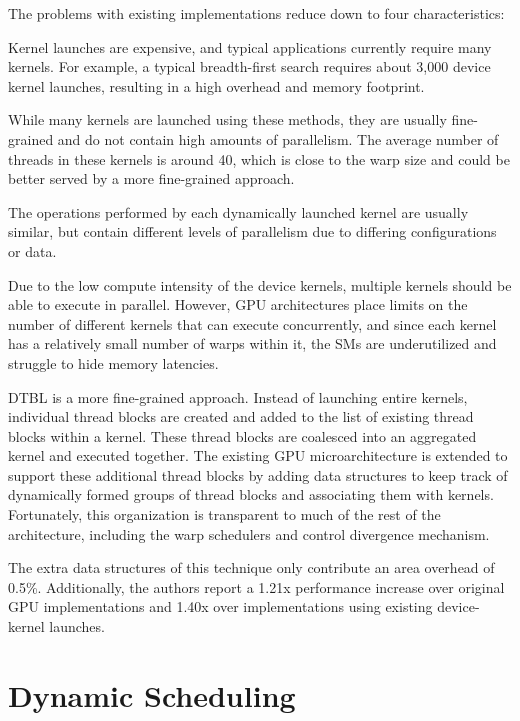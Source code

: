 \documentclass[prodmode,acmtecs]{acmsmall} %
\begin{document}
The problems with existing implementations reduce down to four characteristics:
\begin{description}
  \setlength\itemsep{0.5em}
  \item [High kernel density] Kernel launches are expensive, and typical
  applications currently require many kernels. For example, a typical
  breadth-first search requires about 3,000 device kernel launches, resulting in
  a high overhead and memory footprint.
  \item [Low compute intensity] While many kernels are launched using these
  methods, they are usually fine-grained and do not contain high amounts of
  parallelism. The average number of threads in these kernels is around 40, which
  is close to the warp size and could be better served by a more fine-grained
  approach.
  \item [Workload similarity] The operations performed by each dynamically
  launched kernel are usually similar, but contain different levels of parallelism
  due to differing configurations or data.
  \item [Low concurrency/scheduling efficiency] Due to the low compute intensity
  of the device kernels, multiple kernels should be able to execute in parallel.
  However, GPU architectures place limits on the number of different kernels that
  can execute concurrently, and since each kernel has a relatively small number of
  warps within it, the SMs are underutilized and struggle to hide memory
  latencies.
\end{description}

DTBL is a more fine-grained approach. Instead of launching entire kernels,
individual thread blocks are created and added to the list of existing thread
blocks within a kernel. These thread blocks are coalesced into an aggregated
kernel and executed together. The existing GPU microarchitecture is extended to
support these additional thread blocks by adding data structures to keep track
of dynamically formed groups of thread blocks and associating them with kernels.
Fortunately, this organization is transparent to much of the rest of the
architecture, including the warp schedulers and control divergence mechanism.

The extra data structures of this technique only contribute an area overhead of
0.5\%. Additionally, the authors report a 1.21x performance increase over
original GPU implementations and 1.40x over implementations using existing
device-kernel launches.

\section{Dynamic Scheduling} \label{sec:scheduling}
\end{document}
